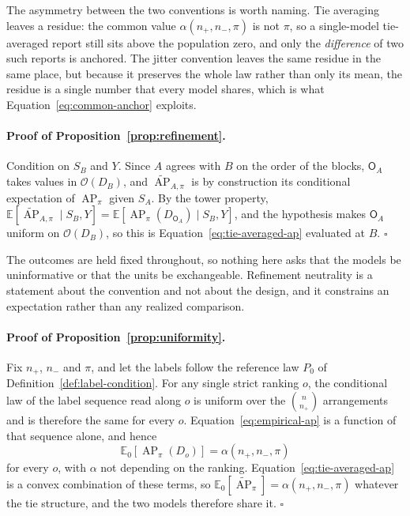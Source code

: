 \documentclass[11pt]{article}
\newcommand{\AP}{\operatorname{AP}}
\newcommand{\E}{\mathbb{E}}
\newcommand{\APta}{\widetilde{\AP}}
\newcommand{\Rank}{\mathsf{O}}
\theoremstyle{remark}
\begin{document}
The asymmetry between the two conventions is worth naming. Tie averaging leaves a residue: the common value $\alpha(n_+,n_-,\pi)$ is not $\pi$, so a single-model tie-averaged report still sits above the population zero, and only the \emph{difference} of two such reports is anchored. The jitter convention leaves the same residue in the same place, but because it preserves the whole law rather than only its mean, the residue is a single number that every model shares, which is what Equation~\eqref{eq:common-anchor} exploits.

\paragraph{Proof of Proposition~\ref{prop:refinement}.}
Condition on $S_B$ and $Y$. Since $A$ agrees with $B$ on the order of the blocks, $\Rank_A$ takes values in $\mathcal{O}(D_B)$, and $\APta_{A,\pi}$ is by construction its conditional expectation of $\AP_\pi$ given $S_A$. By the tower property, $\E[\APta_{A,\pi}\mid S_B,Y]=\E[\AP_\pi(D_{\Rank_A})\mid S_B,Y]$, and the hypothesis makes $\Rank_A$ uniform on $\mathcal{O}(D_B)$, so this is Equation~\eqref{eq:tie-averaged-ap} evaluated at $B$. $\square$

The outcomes are held fixed throughout, so nothing here asks that the models be uninformative or that the units be exchangeable. Refinement neutrality is a statement about the convention and not about the design, and it constrains an expectation rather than any realized comparison.

\paragraph{Proof of Proposition~\ref{prop:uniformity}.}
Fix $n_+$, $n_-$ and $\pi$, and let the labels follow the reference law $P_0$ of Definition~\ref{def:label-condition}. For any single strict ranking $o$, the conditional law of the label sequence read along $o$ is uniform over the $\binom{n}{n_+}$ arrangements and is therefore the same for every $o$. Equation~\eqref{eq:empirical-ap} is a function of that sequence alone, and hence
\[
\E_0\left[\AP_\pi(D_o)\right]
=
\alpha(n_+,n_-,\pi)
\]
for every $o$, with $\alpha$ not depending on the ranking. Equation~\eqref{eq:tie-averaged-ap} is a convex combination of these terms, so $\E_0[\APta_\pi]=\alpha(n_+,n_-,\pi)$ whatever the tie structure, and the two models therefore share it. $\square$
\end{document}
